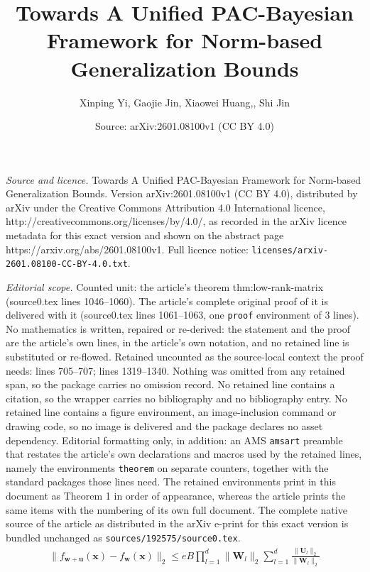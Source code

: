 \documentclass[10pt,a4paper]{amsart}
\title{Towards A Unified PAC-Bayesian Framework for Norm-based Generalization Bounds}
\author{Xinping Yi, Gaojie Jin, Xiaowei Huang,, Shi Jin}
\date{Source: arXiv:2601.08100v1 (CC BY 4.0)}
\newcommand{\Norm}[1]{\|#1\|}
\def\mU{{\bm{U}}}
\def\mW{{\bm{W}}}
\def\vu{{\bm{u}}}
\def\vw{{\bm{w}}}
\def\vx{{\bm{x}}}
\begin{document}
\maketitle

\noindent\emph{Source and licence.} Towards A Unified PAC-Bayesian Framework for Norm-based Generalization Bounds. Version arXiv:2601.08100v1 (CC BY 4.0), distributed by arXiv under the Creative Commons Attribution 4.0 International licence, http://creativecommons.org/licenses/by/4.0/, as recorded in the arXiv licence metadata for this exact version and shown on the abstract page https://arxiv.org/abs/2601.08100v1. Full licence notice: \texttt{licenses/arxiv-2601.08100-CC-BY-4.0.txt}.\par\smallskip

\noindent\textit{Editorial scope.} Counted unit: the article's theorem thm:low-rank-matrix (source0.tex lines 1046--1060). The article's complete original proof of it is delivered with it (source0.tex lines 1061--1063, one \texttt{proof} environment of 3 lines). No mathematics is written, repaired or re-derived: the statement and the proof are the article's own lines, in the article's own notation, and no retained line is substituted or re-flowed.  Retained uncounted as the source-local context the proof needs: lines 705--707; lines 1319--1340.  Nothing was omitted from any retained span, so the package carries no omission record.  No retained line contains a citation, so the wrapper carries no bibliography and no bibliography entry.  No retained line contains a figure environment, an image-inclusion command or drawing code, so no image is delivered and the package declares no asset dependency.  Editorial formatting only, in addition: an AMS \texttt{amsart} preamble that restates the article's own declarations and macros used by the retained lines, namely the environments \texttt{theorem} on separate counters, together with the standard packages those lines need.  The retained environments print in this document as Theorem 1 in order of appearance, whereas the article prints the same items with the numbering of its own full document.  The complete native source of the article as distributed in the arXiv e-print for this exact version is bundled unchanged as \texttt{sources/192575/source0.tex}.
\begin{align} \label{eq:pert-bound-origin}
    \Norm{f_{\vw+\vu}(\vx)-f_{\vw}(\vx)}_2 \le e B \prod_{l=1}^d \|\mW_l\|_2 \sum_{l=1}^d \frac{\|\mU_l\|_2}{\|\mW_l\|_2}
\end{align}
\end{document}
